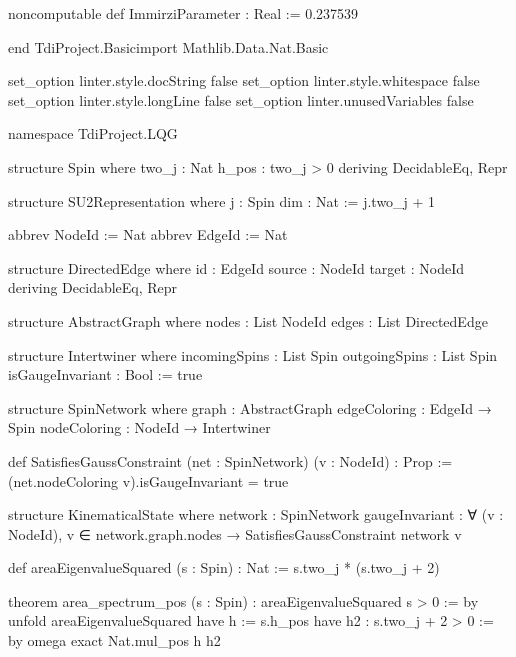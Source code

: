 \documentclass{article}
\newenvironment{Shaded}{%
  \begin{snugshade}%
}{%
  \end{snugshade}%
}%
\newenvironment{Highlighting}{%
}{%
}%
\newcommand{\NormalTok}[1]{#1}
\begin{document}
\begin{Shaded}
\begin{Highlighting}[]
\NormalTok{noncomputable def ImmirziParameter : Real := 0.237539}

\NormalTok{end TdiProject.Basicimport Mathlib.Data.Nat.Basic}

\NormalTok{set\_option linter.style.docString false}
\NormalTok{set\_option linter.style.whitespace false}
\NormalTok{set\_option linter.style.longLine false}
\NormalTok{set\_option linter.unusedVariables false}

\NormalTok{namespace TdiProject.LQG}

\NormalTok{structure Spin where}
\NormalTok{  two\_j : Nat}
\NormalTok{  h\_pos : two\_j \textgreater{} 0}
\NormalTok{  deriving DecidableEq, Repr}

\NormalTok{structure SU2Representation where}
\NormalTok{  j : Spin}
\NormalTok{  dim : Nat := j.two\_j + 1}

\NormalTok{abbrev NodeId := Nat}
\NormalTok{abbrev EdgeId := Nat}

\NormalTok{structure DirectedEdge where}
\NormalTok{  id     : EdgeId}
\NormalTok{  source : NodeId}
\NormalTok{  target : NodeId}
\NormalTok{  deriving DecidableEq, Repr}

\NormalTok{structure AbstractGraph where}
\NormalTok{  nodes : List NodeId}
\NormalTok{  edges : List DirectedEdge}

\NormalTok{structure Intertwiner where}
\NormalTok{  incomingSpins : List Spin}
\NormalTok{  outgoingSpins : List Spin}
\NormalTok{  isGaugeInvariant : Bool := true}

\NormalTok{structure SpinNetwork where}
\NormalTok{  graph        : AbstractGraph}
\NormalTok{  edgeColoring : EdgeId → Spin}
\NormalTok{  nodeColoring : NodeId → Intertwiner}

\NormalTok{def SatisfiesGaussConstraint (net : SpinNetwork) (v : NodeId) : Prop :=}
\NormalTok{  (net.nodeColoring v).isGaugeInvariant = true}

\NormalTok{structure KinematicalState where}
\NormalTok{  network : SpinNetwork}
\NormalTok{  gaugeInvariant : ∀ (v : NodeId), v ∈ network.graph.nodes → SatisfiesGaussConstraint network v}

\NormalTok{def areaEigenvalueSquared (s : Spin) : Nat :=}
\NormalTok{  s.two\_j * (s.two\_j + 2)}

\NormalTok{theorem area\_spectrum\_pos (s : Spin) : areaEigenvalueSquared s \textgreater{} 0 := by}
\NormalTok{  unfold areaEigenvalueSquared}
\NormalTok{  have h := s.h\_pos}
\NormalTok{  have h2 : s.two\_j + 2 \textgreater{} 0 := by omega}
\NormalTok{  exact Nat.mul\_pos h h2}


\end{Highlighting}
\end{Shaded}
\end{document}
